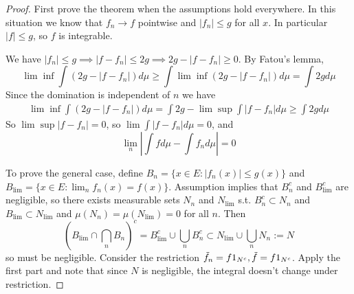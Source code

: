 \documentclass{article}
\theoremstyle{definition}
\theoremstyle{remark}
\theoremstyle{plain}
\begin{document}
\begin{proof}
    First prove the theorem when the assumptions hold everywhere. In this situation we know that $f_n\to f$ pointwise and $|f_n|\le g$ for all $x$. In particular $|f|\le g$, so $f$ is integrable.

    We have $|f_n|\le g\implies |f-f_n|\le 2g\implies 2g-|f-f_n|\ge 0$. By Fatou's lemma, 
    \[\lim\inf\int(2g-|f-f_n|)d\mu\ge\int\lim\inf(2g-|f-f_n|)d\mu=\int 2gd\mu\]
    Since the domination is independent of $n$ we have
    \begin{align*}
        \lim\inf\int(2g-|f-f_n|)d\mu=\int 2g-\lim\sup\int|f-f_n|d\mu\ge\int 2gd\mu
    \end{align*}
    So $\lim\sup|f-f_n|=0$, so $\lim\int |f-f_n|d\mu=0$, and \[\lim_n\left|\int fd\mu-\int f_nd\mu\right|=0\]

    To prove the general case, define $B_n=\{x\in E:|f_n(x)|\le g(x)\}$ and $B_{\lim}=\{x\in E:\lim_nf_n(x)=f(x)\}$. 
    Assumption implies that $B_n^c$ and $B_{\lim}^c$ are negligible, so there exists measurable sets $N_n$ and $N_{\lim}$ s.t. $B_n^c\subset N_n$ and $B_{\lim}\subset N_{\lim}$ and $\mu(N_n)=\mu(N_{\lim})=0$ for all $n$. 
    Then 
    \[\left(B_{\lim}\cap\bigcap_nB_n\right)^c=B_{\lim}^c\cup\bigcup_nB_n^c\subset N_{\lim}\cup\bigcup_nN_n:=N\]
    so must be negligible. Consider the restriction $\Tilde{f}_n=f1_{N^c},\tilde f=f1_{N^c}$. Apply the first part and note that since $N$ is negligible, the integral doesn't change under restriction.
\end{proof}
\end{document}
